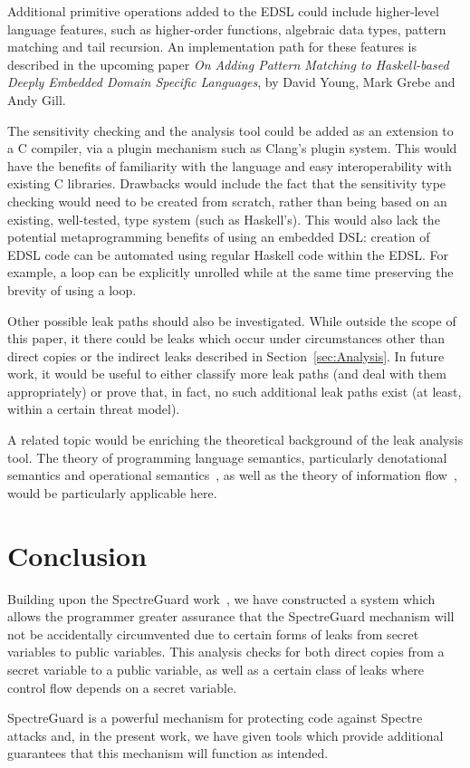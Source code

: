 \documentclass[10pt, conference]{IEEEtran}
\begin{document}
Additional primitive operations added to the EDSL could include higher-level language features, such as higher-order
functions, algebraic data types, pattern matching and tail recursion. An implementation path for
these features is described in the upcoming paper \textit{On Adding Pattern Matching to Haskell-based Deeply Embedded Domain Specific Languages}, by
David Young, Mark Grebe and Andy Gill.~\cite{PatMatchingEDSL}

The sensitivity checking and the analysis tool could be added as an extension to
a C compiler, via a plugin mechanism such as Clang's plugin system. This would
have the benefits of familiarity with the language and easy interoperability
with existing C libraries. Drawbacks would include the fact that the sensitivity type
checking would need to be created from scratch, rather than being based on an existing, well-tested,
type system (such as Haskell's). This would also lack the potential metaprogramming
benefits of using an embedded DSL: creation of EDSL code can be automated using
regular Haskell code within the EDSL. For example, a loop can be explicitly unrolled while
at the same time preserving the brevity of using a loop.

Other possible leak paths should also be investigated. While outside the scope of this paper,
it there could be leaks which occur under circumstances other than direct copies or the indirect
leaks described in Section~\ref{sec:Analysis}. In future work, it would be useful to either
classify more leak paths (and deal with them appropriately) or prove that, in fact, no such additional
leak paths exist (at least, within a certain threat model).

A related topic would be enriching the theoretical background of the leak analysis tool. The theory of
programming language semantics, particularly denotational semantics and operational semantics~\cite{WinskelBook}, as well
as the theory of information flow~\cite{InfoFlowAnalysis}, would be particularly applicable here.


\section{Conclusion}
\label{sec:Conclusion}

Building upon the SpectreGuard work~\cite{SpectreGuard}, we have constructed
a system which allows the programmer greater assurance that the SpectreGuard
mechanism will not be accidentally circumvented due to certain forms of
leaks from secret variables to public variables. This analysis checks for
both direct copies from a secret variable to a public variable, as well as
a certain class of leaks where control flow depends on a secret variable.

SpectreGuard is a powerful mechanism for protecting code against Spectre attacks and,
in the present work, we have given tools which provide additional guarantees
that this mechanism will function as intended.




\end{document}
